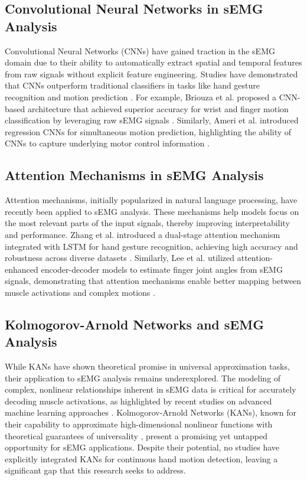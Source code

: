 \subsection{Convolutional Neural Networks in sEMG Analysis}
Convolutional Neural Networks (CNNs) have gained traction in the sEMG domain due to their ability to automatically extract spatial and temporal features from raw signals without explicit feature engineering. Studies have demonstrated that CNNs outperform traditional classifiers in tasks like hand gesture recognition and motion prediction \cite{briouza2021convolutional,ameri2019regression}. For example, Briouza et al. proposed a CNN-based architecture that achieved superior accuracy for wrist and finger motion classification by leveraging raw sEMG signals \cite{briouza2021convolutional}. Similarly, Ameri et al. introduced regression CNNs for simultaneous motion prediction, highlighting the ability of CNNs to capture underlying motor control information \cite{ameri2019regression}.

\subsection{Attention Mechanisms in sEMG Analysis}
Attention mechanisms, initially popularized in natural language processing, have recently been applied to sEMG analysis. These mechanisms help models focus on the most relevant parts of the input signals, thereby improving interpretability and performance. Zhang et al. introduced a dual-stage attention mechanism integrated with LSTM for hand gesture recognition, achieving high accuracy and robustness across diverse datasets \cite{zhang2023lstm}. Similarly, Lee et al. utilized attention-enhanced encoder-decoder models to estimate finger joint angles from sEMG signals, demonstrating that attention mechanisms enable better mapping between muscle activations and complex motions \cite{lee2022explainable}.

\subsection{Kolmogorov-Arnold Networks and sEMG Analysis}
While KANs have shown theoretical promise in universal approximation tasks, their application to sEMG analysis remains underexplored. The modeling of complex, nonlinear relationships inherent in sEMG data is critical for accurately decoding muscle activations, as highlighted by recent studies on advanced machine learning approaches \cite{farago2022review}. Kolmogorov-Arnold Networks (KANs), known for their capability to approximate high-dimensional nonlinear functions with theoretical guarantees of universality \cite{liu2024kan}, present a promising yet untapped opportunity for sEMG applications. Despite their potential, no studies have explicitly integrated KANs for continuous hand motion detection, leaving a significant gap that this research seeks to address.

